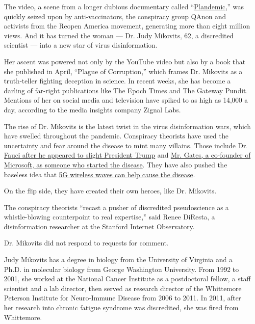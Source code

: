 The video, a scene from a longer dubious documentary called
``\href{https://www.nytimes.com/2020/05/20/technology/plandemic-movie-youtube-facebook-coronavirus.html}{Plandemic},''
was quickly seized upon by anti-vaccinators, the conspiracy group QAnon
and activists from the Reopen America movement, generating more than
eight million views. And it has turned the woman --- Dr. Judy Mikovits,
62, a discredited scientist --- into a new star of virus disinformation.

Her ascent was powered not only by the YouTube video but also by a book
that she published in April, ``Plague of Corruption,'' which frames Dr.
Mikovits as a truth-teller fighting deception in science. In recent
weeks, she has become a darling of far-right publications like The Epoch
Times and The Gateway Pundit. Mentions of her on social media and
television have spiked to as high as 14,000 a day, according to the
media insights company Zignal Labs.

The rise of Dr. Mikovits is the latest twist in the virus disinformation
wars, which have swelled throughout the pandemic. Conspiracy theorists
have used the uncertainty and fear around the disease to mint many
villains. Those include
\href{https://www.nytimes.com/2020/03/28/technology/coronavirus-fauci-trump-conspiracy-target.html}{Dr.
Fauci after he appeared to slight President Trump} and
\href{https://www.nytimes.com/2020/04/17/technology/bill-gates-virus-conspiracy-theories.html}{Mr.
Gates, a co-founder of Microsoft, as someone who started the disease}.
They have also pushed the baseless idea that
\href{https://www.nytimes.com/2020/04/10/technology/coronavirus-5g-uk.html}{5G
wireless waves can help cause the disease}.

On the flip side, they have created their own heroes, like Dr. Mikovits.

The conspiracy theorists ``recast a pusher of discredited pseudoscience
as a whistle-blowing counterpoint to real expertise,'' said Renee
DiResta, a disinformation researcher at the Stanford Internet
Observatory.

Dr. Mikovits did not respond to requests for comment.

Judy Mikovits has a degree in biology from the University of Virginia
and a Ph.D. in molecular biology from George Washington University. From
1992 to 2001, she worked at the National Cancer Institute as a
postdoctoral fellow, a staff scientist and a lab director, then served
as research director of the Whittemore Peterson Institute for
Neuro-Immune Disease from 2006 to 2011. In 2011, after her research into
chronic fatigue syndrome was discredited, she was
\href{https://www.sciencemag.org/news/2011/10/chronic-fatigue-syndrome-researcher-fired-amidst-new-controversy}{fired}
from Whittemore.

